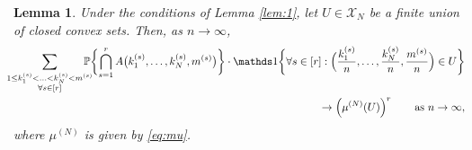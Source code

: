 \documentclass[11pt]{article}
\newcommand{\1}[1][]{
	\ifx&#1&\mathds{1}
	\else\mathds{1}\left\{#1\right\}\fi}
\newtheorem{lemma}{Lemma}[section]
\theoremstyle{definition}
\theoremstyle{remark}
\numberwithin{equation}{section}
\begin{document}
	\begin{lemma}
		\label{lem:2}
		Under the conditions of Lemma \ref{lem:1}, let $U\in\mathcal X_N$ be a finite union of closed convex sets. Then, as $n\to\infty$,
		\begin{equation}
			\label{eq:joint_prob_sum}
			\begin{aligned}
				\hspace{-7pt}\sum_{\substack{1\le k_1^{(s)}<\ldots<k_N^{(s)}<m^{(s)}\\\forall s\in [r]}}
				\hspace{-10pt}\mathbb{P}\biggl\{\bigcap_{s=1}^r A{\bigl(k_1^{(s)}, \ldots, k_N^{(s)}, m^{(s)}\bigr)}\biggr\}\cdot
				\mathds 1{\biggl\{\forall s\in [r]: \Bigl(\frac{k_1^{(s)}}{n},
					\ldots,\frac{k_N^{(s)}}{n}, \frac{m^{(s)}}{n}\Bigr)\in U\biggr\}}\\ 
				\to \left(\mu^{(N)}(U)\right)^r\qquad
				\text{as }n\to\infty,
			\end{aligned}
		\end{equation}
		where $\mu^{(N)}$ is given by \eqref{eq:mu}.
	\end{lemma}
\end{document}
